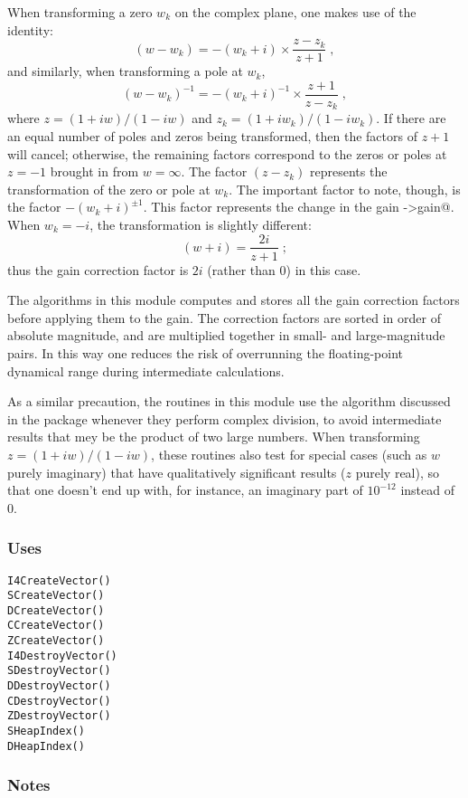 When transforming a zero $w_k$ on the complex plane, one makes use of
the identity:
$$
(w - w_k) = -(w_k + i)\times\frac{z-z_k}{z+1} \; ,
$$
and similarly, when transforming a pole at $w_k$,
$$
(w - w_k)^{-1} = -(w_k + i)^{-1}\times\frac{z+1}{z-z_k} \; ,
$$
where $z=(1+iw)/(1-iw)$ and $z_k=(1+iw_k)/(1-iw_k)$.  If there are an
equal number of poles and zeros being transformed, then the factors of
$z+1$ will cancel; otherwise, the remaining factors correspond to the
zeros or poles at $z=-1$ brought in from $w=\infty$.  The factor
$(z-z_k)$ represents the transformation of the zero or pole at $w_k$.
The important factor to note, though, is the factor $-(w_k+i)^{\pm1}$.
This factor represents the change in the gain \verb@filter->gain@.
When $w_k=-i$, the transformation is slightly different:
$$
(w + i) = \frac{2i}{z+1} \; ;
$$
thus the gain correction factor is $2i$ (rather than 0) in this case.

The algorithms in this module computes and stores all the gain
correction factors before applying them to the gain.  The correction
factors are sorted in order of absolute magnitude, and are multiplied
together in small- and large-magnitude pairs.  In this way one reduces
the risk of overrunning the floating-point dynamical range during
intermediate calculations.

As a similar precaution, the routines in this module use the algorithm
discussed in the \verb@VectorOps@ package whenever they perform
complex division, to avoid intermediate results that mey be the
product of two large numbers.  When transforming $z=(1+iw)/(1-iw)$,
these routines also test for special cases (such as $w$ purely
imaginary) that have qualitatively significant results ($z$ purely
real), so that one doesn't end up with, for instance, an imaginary
part of $10^{-12}$ instead of 0.

\subsubsection{Uses}
\begin{verbatim}
I4CreateVector()
SCreateVector()
DCreateVector()
CCreateVector()
ZCreateVector()
I4DestroyVector()
SDestroyVector()
DDestroyVector()
CDestroyVector()
ZDestroyVector()
SHeapIndex()
DHeapIndex()
\end{verbatim}

\subsubsection{Notes}

